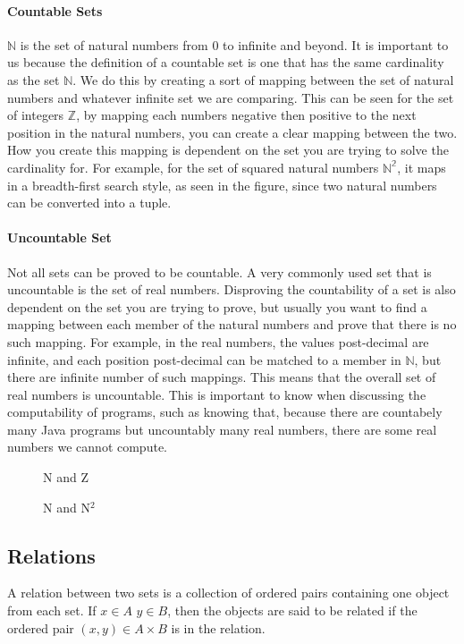 \paragraph{Countable Sets} $\mathbb{N}$ is the set of natural numbers from 0 to infinite and beyond. It is important to us because the definition of a countable set is one that has the same cardinality as the set $\mathbb{N}$. We do this by creating a sort of mapping between the set of natural numbers and whatever infinite set we are comparing. This can be seen for the set of integers $\mathbb{Z}$, by mapping each numbers negative then positive to the next position in the natural numbers, you can create a clear mapping between the two. How you create this mapping is dependent on the set you are trying to solve the cardinality for. For example, for the set of squared natural numbers $\mathbb{N^2}$, it maps in a breadth-first search style, as seen in the figure, since two natural numbers can be converted into a tuple.

\paragraph{Uncountable Set} Not all sets can be proved to be countable. A very commonly used set that is uncountable is the set of real numbers. Disproving the countability of a set is also dependent on the set you are trying to prove, but usually you want to find a mapping between each member of the natural numbers and prove that there is no such mapping. For example, in the real numbers, the values post-decimal are infinite, and each position post-decimal can be matched to a member in $\mathbb{N}$, but there are infinite number of such mappings. This means that the overall set of real numbers is uncountable. This is important to know when discussing the computability of programs, such as knowing that, because there are countabely many Java programs but uncountably many real numbers, there are some real numbers we cannot compute.
\begin{figure}[!htb]
	\caption{\label{fig:zcount} N and Z}
\end{figure}
\begin{figure}[!htb]
	\caption{\label{fig:qcount} N and N$^2$}
\end{figure}

\subsection{Relations}
A relation between two sets is a collection of ordered pairs containing one object from each set. If $x \in A$ $y \in B$, then the objects are said to be related if the ordered pair $\left(x,y \right) \in A \times B$ is in the relation.
